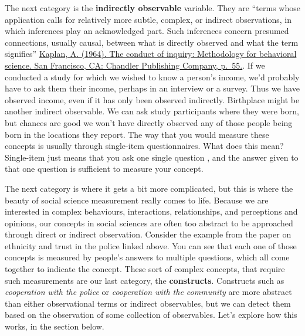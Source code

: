 \documentclass[
]{book}
\begin{document}
The next category is the \textbf{indirectly observable} variable. They are ``terms whose application calls for relatively more subtle, complex, or indirect observations, in which inferences play an acknowledged part. Such inferences concern presumed connections, usually causal, between what is directly observed and what the term signifies'' \href{https://books.google.co.uk/books?id=wxwuDwAAQBAJ\&pg=PT89\&lpg=PT89\&dq=\%22terms+whose+application+calls+for+relatively+more+subtle,+complex,+or+indirect+observations,+in+which+inferences+play+an+acknowledged+part.+Such+inferences+concern+presumed+connections,+usually+causal,+between+what+is+directly+observed+and+what+the+term+signifies\%22\&source=bl\&ots=0_ySczx0oG\&sig=WVdwNE7mUzF_d8dfBk2R_Tq4clw\&hl=en\&sa=X\&ved=0ahUKEwihna-v5OrWAhXMYVAKHXvEBpIQ6AEIJjAA\#v=onepage\&q=\%22terms\%20whose\%20application\%20calls\%20for\%20relatively\%20more\%20subtle\%2C\%20complex\%2C\%20or\%20indirect\%20observations\%2C\%20in\%20which\%20inferences\%20play\%20an\%20acknowledged\%20part.\%20Such\%20inferences\%20concern\%20presumed\%20connections\%2C\%20usually\%20causal\%2C\%20between\%20what\%20is\%20directly\%20observed\%20and\%20what\%20the\%20term\%20signifies\%22\&f=false}{Kaplan, A. (1964). The conduct of inquiry: Methodology for behavioral science. San Francisco, CA: Chandler Publishing Company, p.~55.}. If we conducted a study for which we wished to know a person's income, we'd probably have to ask them their income, perhaps in an interview or a survey. Thus we have observed income, even if it has only been observed indirectly. Birthplace might be another indirect observable. We can ask study participants where they were born, but chances are good we won't have directly observed any of those people being born in the locations they report. The way that you would measure these concepts is usually through single-item questionnaires. What does this mean? Single-item just means that you ask one single question , and the answer given to that one question is sufficient to measure your concept.

The next category is where it gets a bit more complicated, but this is where the beauty of social science measurement really comes to life. Because we are interested in complex behaviours, interactions, relationships, and perceptions and opinions, our concepts in social sciences are often too abstract to be approached through direct or indirect observation. Consider the example from the paper on ethnicity and trust in the police linked above. You can see that each one of those concepts is measured by people's answers to multiple questions, which all come together to indicate the concept. These sort of complex concepts, that require such measurements are our last category, the \textbf{constructs}. Constructs such as \emph{cooperation with the police} or \emph{cooperation with the community} are more abstract than either observational terms or indirect observables, but we can detect them based on the observation of some collection of observables. Let's explore how this works, in the section below.
\end{document}
